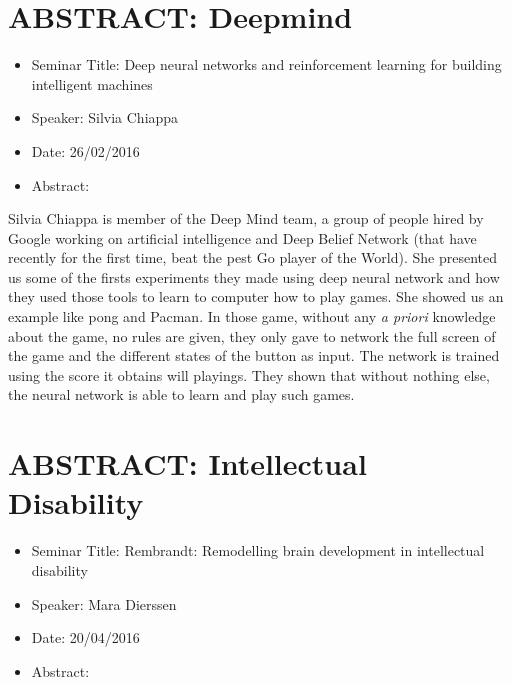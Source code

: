 \documentclass[10pt,letterpaper]{article}
\begin{document}
\section{ABSTRACT: Deepmind}
\begin{itemize}
    \item Seminar Title: Deep neural networks and reinforcement learning for building intelligent machines
    \item Speaker: Silvia Chiappa
    \item Date: 26/02/2016
    \item Abstract: 
\end{itemize}
Silvia Chiappa is member of the Deep Mind team, a group of people hired by Google working on artificial intelligence and Deep Belief Network (that have recently for the first time, beat the pest Go player of the World). She presented us some of the firsts experiments they made using deep neural network and how they used those tools to learn to computer how to play games.  She showed us an example like pong and Pacman. In those game, without any \emph{a priori} knowledge about the game, no rules are given, they only gave to network the full screen of the game and the different states of the button as input. The network is trained using  the score it obtains will playings. They shown that without nothing else, the neural network is able to learn and play such games.  


\section{ABSTRACT: Intellectual Disability }
\begin{itemize}
    \item Seminar Title: Rembrandt: Remodelling brain development in intellectual disability 
    \item Speaker: Mara Dierssen
    \item Date: 20/04/2016
    \item Abstract:
\end{itemize}

%
\end{document}
